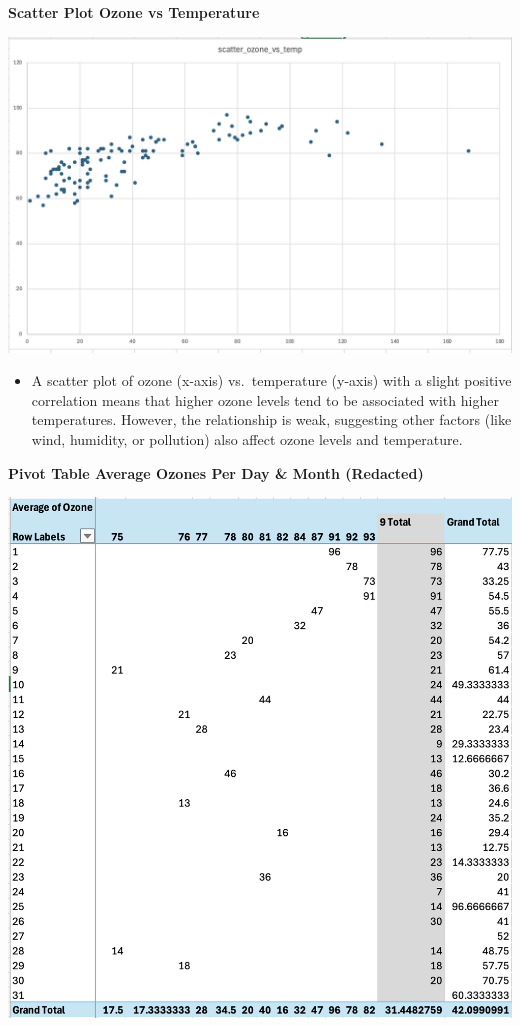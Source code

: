 \documentclass[
  letterpaper,
  DIV=11,
  numbers=noendperiod]{scrreprt}
\providecommand{\tightlist}{%
  \setlength{\itemsep}{0pt}\setlength{\parskip}{0pt}}\usepackage{longtable,booktabs,array}
\begin{document}
\textbf{Scatter Plot Ozone vs Temperature}

\includegraphics{scatter_ozone_vs_temp_baruga.png}

\begin{itemize}
\tightlist
\item
  A scatter plot of ozone (x-axis) vs.~temperature (y-axis) with a
  slight positive correlation means that higher ozone levels tend to be
  associated with higher temperatures. However, the relationship is
  weak, suggesting other factors (like wind, humidity, or pollution)
  also affect ozone levels and temperature.
\end{itemize}

\textbf{Pivot Table Average Ozones Per Day \& Month (Redacted)}

\includegraphics{pivot4_table_baruga.png}
\end{document}
